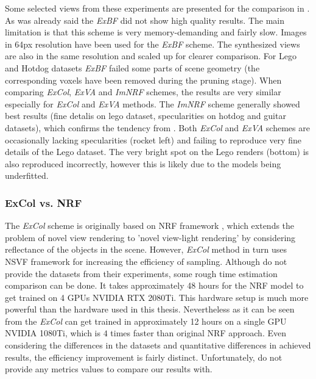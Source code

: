 Some selected views from these experiments are presented for the comparison in .
As was already said the \textit{ExBF} did not show high quality results.
The main limitation is that this scheme is very memory-demanding and fairly slow.
Images in 64px resolution have been used for the \textit{ExBF} scheme.
The synthesized views are also in the same resolution and scaled up for clearer comparison.
For Lego and Hotdog datasets \textit{ExBF} failed some parts of scene geometry 
(the corresponding voxels have been removed during the pruning stage).
When comparing \textit{ExCol}, \textit{ExVA} and \textit{ImNRF} schemes,
the results are very similar especially for \textit{ExCol} and \textit{ExVA} methods.
The \textit{ImNRF} scheme generally showed best results
(fine detalis on lego dataset, specularities on hotdog and guitar datasets),
which confirms the tendency from .
Both \textit{ExCol} and \textit{ExVA} schemes are occasionally lacking specularities (rocket left)
and failing to reproduce very fine details of the Lego dataset.
The very bright spot on the Lego renders (bottom) is also reproduced incorrectly,
however this is likely due to the models being underfitted.

\subsubsection{ExCol vs. NRF}

The \textit{ExCol} scheme is originally based on NRF framework \cite{bi2020neural},
which extends the problem of novel view rendering to
'novel view-light rendering' by considering reflectance of the objects in the scene.
However, \textit{ExCol} method in turn uses NSVF framework for increasing the efficiency of sampling.
Although \cite{bi2020neural} do not provide the datasets from their experiments,
some rough time estimation comparison can be done.
It takes approximately 48 hours for the NRF model to get trained on 4 GPUs NVIDIA RTX 2080Ti.
This hardware setup is much more powerful than the hardware used in this thesis.
Nevertheless as it can be seen from 
the \textit{ExCol} can get trained in approximately 12 hours on a single GPU NVIDIA 1080Ti,
which is $4$ times faster than original NRF approach.
Even considering the differences in the datasets and quantitative differences in achieved results,
the efficiency improvement is fairly distinct.
Unfortunately, \cite{bi2020neural} do not provide any metrics values to compare our results with.




